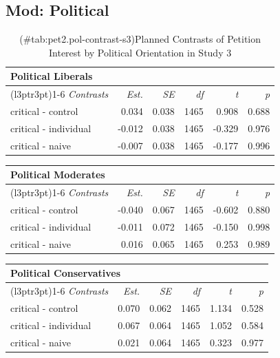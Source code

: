 \documentclass[
]{book}
\begin{document}
\hypertarget{mod-political-12}{%
\subsection{Mod: Political}\label{mod-political-12}}

\begin{table}

\caption{(\#tab:pet2.pol-contrast-s3)Planned Contrasts of Petition Interest by Political Orientation in Study 3}
\centering
\begin{tabular}[t]{lrrrrr}
\toprule
\multicolumn{6}{l}{Political Liberals} \\
\cmidrule(l{3pt}r{3pt}){1-6}
\em{Contrasts} & \em{Est.} & \em{SE} & \em{df} & \em{t} & \em{p}\\
\midrule
critical - control & 0.034 & 0.038 & 1465 & 0.908 & 0.688\\
critical - individual & -0.012 & 0.038 & 1465 & -0.329 & 0.976\\
critical - naive & -0.007 & 0.038 & 1465 & -0.177 & 0.996\\
\bottomrule
\end{tabular}
\end{table}

\begin{table}
\centering
\begin{tabular}{lrrrrr}
\toprule
\multicolumn{6}{l}{Political Moderates} \\
\cmidrule(l{3pt}r{3pt}){1-6}
\em{Contrasts} & \em{Est.} & \em{SE} & \em{df} & \em{t} & \em{p}\\
\midrule
critical - control & -0.040 & 0.067 & 1465 & -0.602 & 0.880\\
critical - individual & -0.011 & 0.072 & 1465 & -0.150 & 0.998\\
critical - naive & 0.016 & 0.065 & 1465 & 0.253 & 0.989\\
\bottomrule
\end{tabular}
\end{table}

\begin{table}
\centering
\fontsize{13}{15}\selectfont
\begin{tabular}{lrrrrr}
\toprule
\multicolumn{6}{l}{Political Conservatives} \\
\cmidrule(l{3pt}r{3pt}){1-6}
\em{Contrasts} & \em{Est.} & \em{SE} & \em{df} & \em{t} & \em{p}\\
\midrule
critical - control & 0.070 & 0.062 & 1465 & 1.134 & 0.528\\
critical - individual & 0.067 & 0.064 & 1465 & 1.052 & 0.584\\
critical - naive & 0.021 & 0.064 & 1465 & 0.323 & 0.977\\
\bottomrule
\end{tabular}
\end{table}
\end{document}
